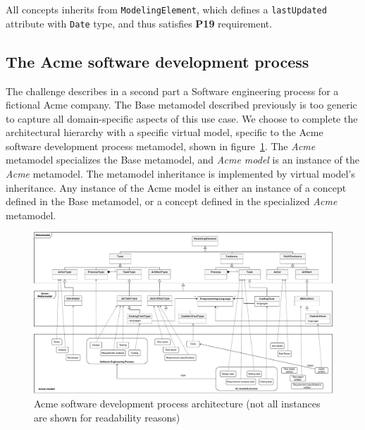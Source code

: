 All concepts inherits from \texttt{ModelingElement}, which defines a \texttt{lastUpdated} attribute with \texttt{Date} type, and thus satisfies \textbf{P19} requirement.

\subsection{The Acme software development process}
\label{sec:AcmeSoftwareDevelopmentProcess}

The challenge describes in a second part a Software engineering process for a fictional Acme company. The Base metamodel described previously is too generic to capture all domain-specific aspects of this use case. We choose to complete the architectural hierarchy with a specific virtual model, specific to the Acme software development process metamodel, shown in figure~\ref{fig:AcmeFullArchitecture}.
The \textit{Acme} metamodel specializes the Base metamodel, and \textit{Acme model} is an instance of the \textit{Acme} metamodel. The metamodel inheritance is implemented by virtual model's inheritance. Any instance of the Acme model is either an instance of a concept defined in the Base metamodel, or a concept defined in the specialized \textit{Acme} metamodel.


\begin{figure}
 \centering
     \includegraphics[width=1.0 \textwidth]{Figures/AcmeFullArchitecture.pdf}
     \caption{Acme software development process architecture (not all instances are shown for readability reasons)}
    \label{fig:AcmeFullArchitecture}
\end{figure}

